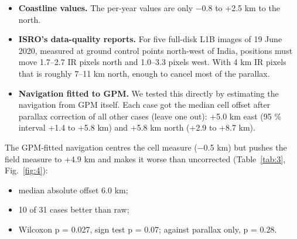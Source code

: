 \begin{enumerate}
  \begin{itemize}
  \tightlist
  \item
    \textbf{Coastline values.} The per-year values are only −0.8 to +2.5 km to the north.
  \item
    \textbf{ISRO's data-quality reports.} For five full-disk L1B images of 19 June 2020, measured at ground control points north-west of India, positions must move 1.7--2.7 IR pixels north and 1.0--3.3 pixels west. With 4 km IR pixels that is roughly 7--11 km north, enough to cancel most of the parallax.
  \item
    \textbf{Navigation fitted to GPM.} We tested this directly by estimating the navigation from GPM itself. Each case got the median cell offset after parallax correction of all other cases (leave one out): +5.0 km east (95 \% interval +1.4 to +5.8 km) and +5.8 km north (+2.9 to +8.7 km).
  \end{itemize}

  The GPM-fitted navigation centres the cell measure (−0.5 km) but pushes the field measure to +4.9 km and makes it worse than uncorrected (Table~\ref{tab:3}, Fig.~\ref{fig:4}):

  \begin{itemize}
  \tightlist
  \item
    median absolute offset 6.0 km;
  \item
    10 of 31 cases better than raw;
  \item
    Wilcoxon p = 0.027, sign test p = 0.07; against parallax only, p = 0.28.
  \end{itemize}


\end{enumerate}
